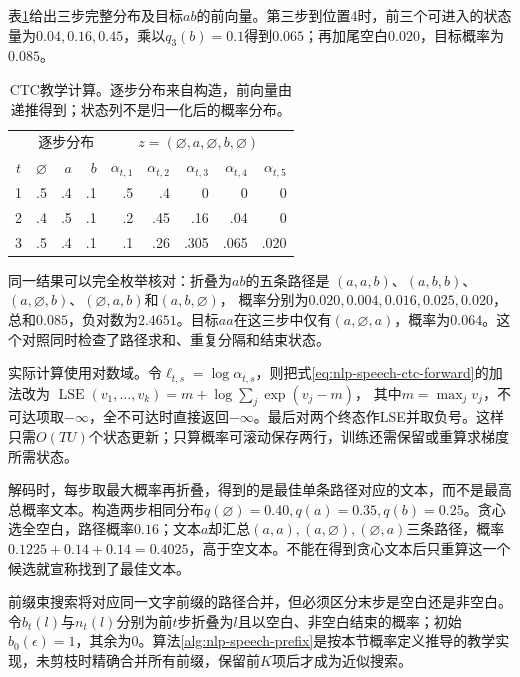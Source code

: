 表\ref{tab:nlp-speech-ctc-numbers}给出三步完整分布及目标$ab$的前向量。第三步到位置4时，前三个可进入的状态量为$0.04,0.16,0.45$，乘以$q_3(b)=0.1$得到$0.065$；再加尾空白$0.020$，目标概率为$0.085$。

\begin{table}[htbp]
  \centering
  \begin{tabular}{@{}crrrrrrrr@{}}
    \toprule
    & \multicolumn{3}{c}{逐步分布} & \multicolumn{5}{c}{$z=(\varnothing,a,\varnothing,b,\varnothing)$}\\
    $t$ & $\varnothing$ & $a$ & $b$ & $\alpha_{t,1}$ & $\alpha_{t,2}$ & $\alpha_{t,3}$ & $\alpha_{t,4}$ & $\alpha_{t,5}$\\
    \midrule
    1 & .5 & .4 & .1 & .5 & .4 & 0 & 0 & 0\\
    2 & .4 & .5 & .1 & .2 & .45 & .16 & .04 & 0\\
    3 & .5 & .4 & .1 & .1 & .26 & .305 & .065 & .020\\
    \bottomrule
  \end{tabular}
  \caption{CTC教学计算。逐步分布来自构造，前向量由递推得到；状态列不是归一化后的概率分布。}
  \label{tab:nlp-speech-ctc-numbers}
\end{table}

同一结果可以完全枚举核对：折叠为$ab$的五条路径是
$(a,a,b)$、$(a,b,b)$、$(a,\varnothing,b)$、$(\varnothing,a,b)$和$(a,b,\varnothing)$，
概率分别为$0.020,0.004,0.016,0.025,0.020$，总和$0.085$，负对数为$2.4651$。目标$aa$在这三步中仅有$(a,\varnothing,a)$，概率为$0.064$。这个对照同时检查了路径求和、重复分隔和结束状态。

实际计算使用对数域。令$\ell_{t,s}=\log\alpha_{t,s}$，则把式\eqref{eq:nlp-speech-ctc-forward}的加法改为
$\operatorname{LSE}(v_1,\ldots,v_k)=m+\log\sum_j\exp(v_j-m)$，
其中$m=\max_jv_j$，不可达项取$-\infty$，全不可达时直接返回$-\infty$。最后对两个终态作LSE并取负号。这样只需$O(TU)$个状态更新；只算概率可滚动保存两行，训练还需保留或重算求梯度所需状态。

解码时，每步取最大概率再折叠，得到的是最佳单条路径对应的文本，而不是最高总概率文本。构造两步相同分布$q(\varnothing)=0.40,q(a)=0.35,q(b)=0.25$。贪心选全空白，路径概率$0.16$；文本$a$却汇总$(a,a),(a,\varnothing),(\varnothing,a)$三条路径，概率$0.1225+0.14+0.14=0.4025$，高于空文本。不能在得到贪心文本后只重算这一个候选就宣称找到了最佳文本。

前缀束搜索将对应同一文字前缀的路径合并，但必须区分末步是空白还是非空白。令$b_t(l)$与$n_t(l)$分别为前$t$步折叠为$l$且以空白、非空白结束的概率；初始$b_0(\epsilon)=1$，其余为0。算法\ref{alg:nlp-speech-prefix}是按本节概率定义推导的教学实现，未剪枝时精确合并所有前缀，保留前$K$项后才成为近似搜索。

